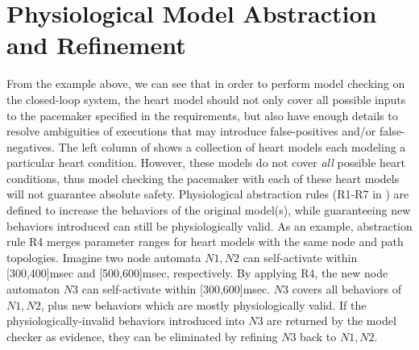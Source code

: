 \section{Physiological Model Abstraction and Refinement}
From the example above, we can see that in order to perform model checking on the closed-loop system, the heart model should not only cover all possible inputs to the pacemaker specified in the requirements, but also have enough details to resolve ambiguities of executions that may introduce false-positives and/or false-negatives. 
 The left column of  shows a collection of heart models each modeling a particular heart condition.  
However, these models do not cover \emph{all} possible heart conditions, thus model checking the pacemaker with each of these heart models will not guarantee absolute safety. 
Physiological abstraction rules (R1-R7 in ) are defined to increase the behaviors of the original model(s), while guaranteeing new behaviors introduced can still be physiologically valid.
As an example, abstraction rule R4 merges parameter ranges for heart models with the same node and path topologies.
Imagine two node automata $N1,N2$ can self-activate within [300,400]msec and [500,600]msec, respectively.
By applying R4, the new node automaton $N3$ can self-activate within [300,600]msec.
$N3$ covers all behaviors of $N1,N2$, plus new behaviors which are mostly physiologically valid.
If the physiologically-invalid behaviors introduced into $N3$ are returned by the model checker as evidence, they can be eliminated by refining $N3$ back to $N1,N2$.

